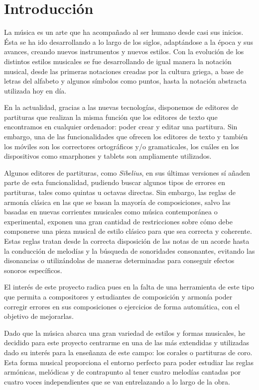 \chapter*{Introducción}

La música es un arte que ha acompañado al ser humano desde casi sus inicios. Ésta se ha ido desarrollando a lo largo de los siglos, adaptándose a la época y sus avances, creando nuevos instrumentos y nuevos estilos. Con la evolución de los distintos estilos musicales se fue desarrollando de igual manera la notación musical, desde las primeras notaciones creadas por la cultura griega, a base de letras del alfabeto y algunos símbolos como puntos, hasta la notación abstracta utilizada hoy en día. 

En la actualidad, gracias a las nuevas tecnologías, disponemos de editores de partituras que realizan la misma función que los editores de texto que encontramos en cualquier ordenador: poder crear y editar una partitura. Sin embargo, una de las funcionalidades que ofrecen los editores de texto y también los móviles son los correctores ortográficos y/o gramaticales, los cuáles en los dispositivos como smarphones y tablets son ampliamente utilizados. 

Algunos editores de partituras, como \textit{Sibelius}, en sus últimas versiones sí añaden parte de esta funcionalidad, pudiendo buscar algunos tipos de errores en partituras, tales como quintas u octavas directas. Sin embargo, las reglas de armonía clásica en las que se basan la mayoría de composiciones, salvo las basadas en nuevas corrientes musicales como música contemporánea o experimental, exponen una gran cantidad de restricciones sobre cómo debe componerse una pieza musical de estilo clásico para que sea correcta y coherente.  Estas reglas tratan desde la correcta disposición de las notas de un acorde hasta la conducción de melodías y la búsqueda de sonoridades consonantes, evitando las disonancias o utilizándolas de maneras determinadas para conseguir efectos sonoros específicos. 

El interés de este proyecto radica pues en la falta de una herramienta de este tipo que permita a compositores y estudiantes de composición y armonía poder corregir errores en sus composiciones o ejercicios de forma automática, con el objetivo de mejorarlas.

Dado que la música abarca una gran variedad de estilos y formas musicales, he decidido para este proyecto centrarme en una de las más extendidas y utilizadas dado su interés para la enseñanza de este campo: los corales o partituras de coro. Esta forma musical proporciona el entorno perfecto para poder estudiar las reglas armónicas, melódicas y de contrapunto al tener cuatro melodías cantadas por cuatro voces independientes que se van entrelazando a lo largo de la obra. 

